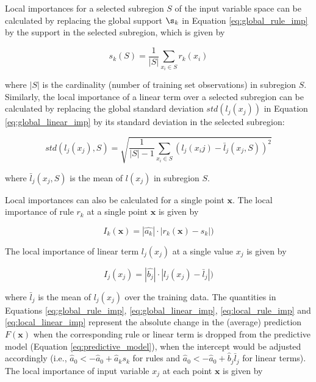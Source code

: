 \documentclass[nobf,doc]{apa}
\begin{document}
Local importances for a selected subregion $S$ of the input variable space can be calculated by replacing the global support $\s_k$ in Equation \ref{eq:global_rule_imp} by the support in the selected subregion, which is given by

\begin{equation}
	s_k(S) = \frac{1}{|S|} \sum_{x_i \in S}{r_k(x_i)}
	\label{eq:local_support}
\end{equation}

where $|S|$ is the cardinality (number of training set observations) in subregion $S$. Similarly, the local importance of a linear term over a selected subregion can be calculated by replacing the global standard deviation $\textit{std}(l_j(x_j))$ in Equation \ref{eq:global_linear_imp} by its standard deviation in the selected subregion:

\begin{equation}
	\textit{std}(l_j(x_j), S) = \sqrt{ \frac{1}{|S| - 1} \sum_{x_i \in S}{(l_j(x_ij) - \bar{l}_j(x_j, S))^2} }
	\label{eq:local_sd}
\end{equation}

where $\bar{l}_j(x_j, S)$ is the mean of $l(x_j)$ in subregion $S$. 

Local importances can also be calculated for a single point $\mathbf{x}$. The local importance of rule $r_k$ at a single point $\mathbf{x}$ is given by

\begin{equation}
	I_k(\mathbf{x}) = |\hat{a_k}| \cdot |r_k(\mathbf{x}) - s_k |)%
	\label{eq:local_rule_imp}
\end{equation}

The local importance of linear term $l_j(x_j)$ at a single value $x_j$ is given by

\begin{equation}
	I_j(x_j) = |\hat{b_j}| \cdot |l_j(x_j) - \bar{l}_j |)%
	\label{local_linear_imp}
\end{equation}

where $\bar{l}_j$ is the mean of $l_j(x_j)$ over the training data. The quantities in Equations \ref{eq:global_rule_imp}, \ref{eq:global_linear_imp}, \ref{eq:local_rule_imp} and \ref{eq:local_linear_imp} represent the absolute change in the (average) prediction $F(\mathbf{x})$ when the corresponding rule or linear term is dropped from the predictive model (Equation \ref{eq:predictive_model}), when the intercept would be adjusted accordingly (i.e., $\hat{a}_0 <- \hat{a}_0 + \hat{a}_k s_k$ for rules and $\hat{a}_0 <- \hat{a}_0 + \hat{b}_j \bar{l}_j$ for linear terms). The local importance of input variable $x_j$ at each point $\mathbf{x}$ is given by
\end{document}
